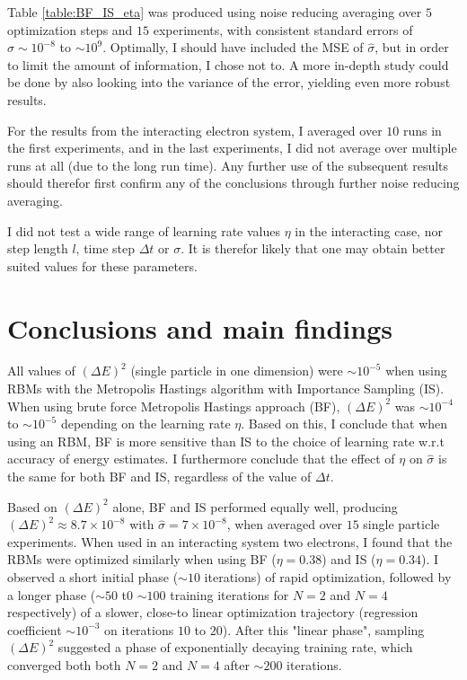 \documentclass[%
oneside,                 %
final,                   %
10pt]{article}
\begin{document}
Table \ref{table:BF_IS_eta} was produced using noise reducing averaging over $5$ optimization steps and $15$ experiments, with consistent standard errors of $\sigma \sim 10^{-8}$ to $\sim 10^{9}$. Optimally, I should have included the MSE of $\hat \sigma$, but in order to limit the amount of information, I chose not to. A more  in-depth study could be done by also looking into the variance of the error, yielding even more robust results.

For the results from the interacting electron system, I averaged over $10$ runs in the first experiments, and in the last experiments, I did not average over multiple runs at all (due to the long run time). Any further use of the subsequent results should therefor first confirm any of the conclusions through further noise reducing averaging. 

I did not test a wide range of learning rate values $\eta$ in the interacting case, nor step length $l$, time step $\Delta t$ or $\sigma$. It is therefor likely that one may obtain better suited values for these parameters.
\section{Conclusions and main findings} \label{conclusions}
All values of $(\Delta E)^2$ (single particle in one dimension) were $\sim 10^{-5}$ when using RBMs with the Metropolis Hastings algorithm with Importance Sampling (IS). When using brute force Metropolis Hastings approach (BF),  $(\Delta E)^2$ was  $\sim 10^{-4}$ to $\sim 10^{-5}$ depending on the learning rate $\eta$. Based on this, I conclude that when using an RBM, BF is more sensitive than IS to the choice of learning rate w.r.t accuracy of energy estimates. I furthermore conclude that the effect of $\eta$  on $\hat \sigma$ is the same for both BF and IS, regardless of the value of $\Delta t$. 

Based on $(\Delta E)^2$ alone, BF and IS performed equally well, producing $(\Delta E)^2 \approx 8.7 \times 10^{-8}$ with $\hat \sigma = 7 \times 10^{-8}$, when averaged over $15$ single particle experiments. When used in an interacting system two electrons, I found that the RBMs were optimized similarly when using BF ($\eta=0.38$) and IS ($\eta=0.34$). I observed a short initial phase ($\sim 10$ iterations) of rapid optimization, followed by a longer phase ($\sim 50$ t0 $\sim 100$ training iterations for $N=2$ and $N=4$ respectively) of a slower, close-to linear optimization trajectory (regression coefficient $\sim 10^{-3}$ on iterations $10$ to $20$). After this "linear phase", sampling $(\Delta E)^2$ suggested a phase of exponentially decaying training rate, which converged both both $N=2$ and $N=4$ after $\sim 200$ iterations.
\end{document}
